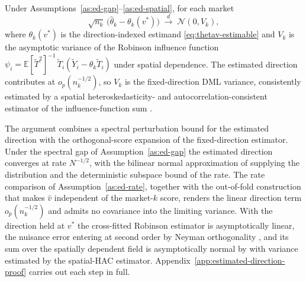 \begin{theorem}\label{thm:estimated-direction}
Under Assumptions~\ref{as:ed-gap}--\ref{as:ed-spatial}, for each market
\[
\sqrt{n_k}\,\bigl(\hat\theta_k-\theta_k(v^\ast)\bigr)\;\xrightarrow{d}\;\mathcal
N(0,V_k),
\]
where $\theta_k(v^\ast)$ is the direction-indexed estimand \eqref{eq:thetav-estimable}
and $V_k$ is the asymptotic variance of the Robinson influence function
$\psi_i=\mathbb{E}[\tilde T^2]^{-1}\,\tilde T_i(\tilde Y_i-\theta_k\tilde T_i)$ under
spatial dependence. The estimated direction contributes at $o_p(n_k^{-1/2})$, so $V_k$
is the fixed-direction DML variance, consistently estimated by a spatial
heteroskedasticity- and autocorrelation-consistent estimator of the
influence-function sum \citep{conley1999gmm,bester2011inference}.
\end{theorem}

The argument combines a spectral perturbation bound for the estimated direction with
the orthogonal-score expansion of the fixed-direction estimator. Under the spectral gap
of Assumption~\ref{as:ed-gap} the estimated direction converges at rate $N^{-1/2}$,
with the bilinear normal approximation of \citet{koltchinskii2016asymptotics} supplying
the distribution and the deterministic subspace bound of \citet{yu2015useful} the rate.
The rate comparison of Assumption~\ref{as:ed-rate}, together with the out-of-fold
construction that makes $\hat v$ independent of the market-$k$ score, renders the linear
direction term $o_p(n_k^{-1/2})$ and admits no covariance into the limiting variance.
With the direction held at $v^\ast$ the cross-fitted Robinson estimator is
asymptotically linear, the nuisance error entering at second order by Neyman
orthogonality \citep{chernozhukov2018double}, and its sum over the spatially dependent
field is asymptotically normal by \citet{jenish2009central} with variance estimated by
the spatial-HAC estimator. Appendix~\ref{app:estimated-direction-proof} carries out each
step in full.

